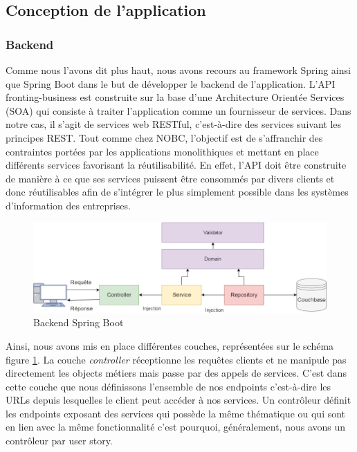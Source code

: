 \subsection{Conception de l'application}

\subsubsection{Backend}

	Comme nous l'avons dit plus haut, nous avons recours au framework Spring ainsi que Spring Boot dans le but de développer le backend de l'application. L'API fronting-business est construite sur la base d'une Architecture Orientée Services (SOA) qui consiste à traiter l'application comme un fournisseur de services. Dans notre cas, il s'agit de services web RESTful, c'est-à-dire des services suivant les principes REST. Tout comme chez NOBC, l'objectif est de s'affranchir des contraintes portées par les applications monolithiques et mettant en place différents services favorisant la réutilisabilité. En effet, l'API doit être construite de manière à ce que ses services puissent être consommés par divers clients et donc réutilisables afin de s'intégrer le plus simplement possible dans les systèmes d'information des entreprises. \\
	
\begin{figure}[h!]
	\includegraphics[scale=0.50]{images/travailBP1818/architecture/spring.png}
	\centering
	\caption{Backend Spring Boot}
	\label{spring}
\end{figure}
	
	Ainsi, nous avons mis en place différentes couches, représentées sur le schéma figure \ref{spring}. La couche \textit{controller} réceptionne les requêtes clients et ne manipule pas directement les objects métiers mais passe par des appels de services. C'est dans cette couche que nous définissons l'ensemble de nos endpoints c'est-à-dire les URLs depuis lesquelles le client peut accéder à nos services. Un contrôleur définit les endpoints exposant des services qui possède la même thématique ou qui sont en lien avec la même fonctionnalité c'est pourquoi, généralement, nous avons un contrôleur par user story. \\
	
